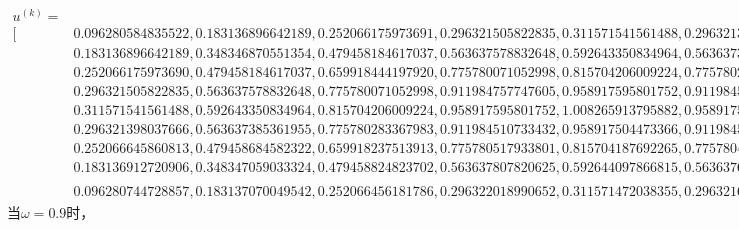 \documentclass[10pt,a4paper]{article}
\begin{document}
\begin{align*}
u^{(k)}=&\\
[&0.096280584835522,0.183136896642189,0.252066175973691,0.296321505822835,0.311571541561488,0.296321398037666,0.252066645860813,0.183136912720906,0.096280744728857,\\
&0.183136896642189,0.348346870551354,0.479458184617037,0.563637578832648,0.592643350834964,0.563637385361955,0.479458684582322,0.348347059033324,0.183137070049542,\\
&0.252066175973690,0.479458184617037,0.659918444197920,0.775780071052998,0.815704206009224,0.775780283367984,0.659918237513913,0.479458824823702,0.252066456181786,\\
&0.296321505822835,0.563637578832648,0.775780071052998,0.911984757747605,0.958917595801752,0.911984510733432,0.775780517933801,0.563637807820625,0.296322018990652,\\
&0.311571541561488,0.592643350834964,0.815704206009224,0.958917595801752,1.008265913795882,0.958917504473366,0.815704187692265,0.592644097866816,0.311571472038355,\\
&0.296321398037666,0.563637385361955,0.775780283367983,0.911984510733432,0.958917504473366,0.911984513206622,0.775780424012973,0.563637667788378,0.296321627057609,\\
&0.252066645860813,0.479458684582322,0.659918237513913,0.775780517933801,0.815704187692265,0.775780424012973,0.659918299451593,0.479458828454800,0.252066473940547,\\
&0.183136912720906,0.348347059033324,0.479458824823702,0.563637807820625,0.592644097866815,0.563637667788378,0.479458828454801,0.348347617018303,0.183137232782245,\\
&0.096280744728857,0.183137070049542,0.252066456181786,0.296322018990652,0.311571472038355,0.296321627057609,0.252066473940547,0.183137232782244,0.096280630157131]^T
\end{align*}
\normalsize
当$\omega=0.9$时，
\tiny
\end{document}
